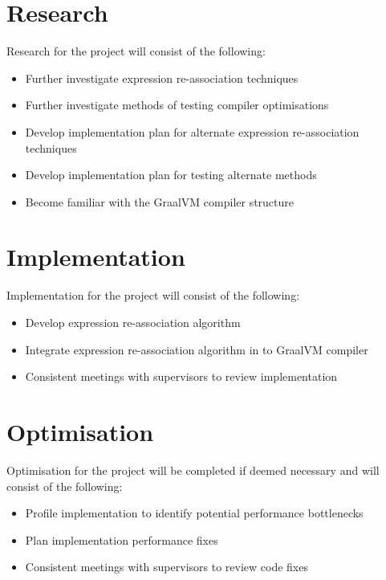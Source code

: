 \documentclass[12pt,openany,a4paper]{book}
\begin{document}
\section{Research}
\label{research}

Research for the project will consist of the following:

\begin{itemize}
\item Further investigate expression re-association techniques
\item Further investigate methods of testing compiler optimisations
\item Develop implementation plan for alternate expression re-association techniques
\item Develop implementation plan for testing alternate methods
\item Become familiar with the GraalVM compiler structure
\end{itemize}

\section{Implementation}
\label{implementation}

Implementation for the project will consist of the following:

\begin{itemize}
\item Develop expression re-association algorithm
\item Integrate expression re-association algorithm in to GraalVM compiler
\item Consistent meetings with supervisors to review implementation
\end{itemize}

\section{Optimisation}
\label{optimisation}

Optimisation for the project will be completed if deemed necessary and will
consist of the following:

\begin{itemize}
\item Profile implementation to identify potential performance bottlenecks
\item Plan implementation performance fixes
\item Consistent meetings with supervisors to review code fixes
\end{itemize}
\end{document}
